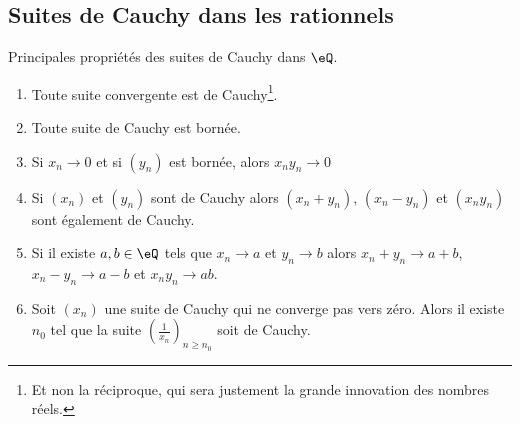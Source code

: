 \subsection{Suites de Cauchy dans les rationnels}

\begin{proposition}        \label{PropFFDJooAapQlP}
    Principales propriétés des suites de Cauchy dans \( \eQ\).
    \begin{enumerate}
        \item       \label{ItemRKCIooJguHdji}
            Toute suite convergente est de Cauchy\footnote{Et non la réciproque, qui sera justement la grande innovation des nombres réels.}.
        \item       \label{ItemRKCIooJguHdjii}
            Toute suite de Cauchy est bornée.
        \item       \label{ItemRKCIooJguHdjiii}
            Si \( x_n\to 0\) et si \( (y_n)\) est bornée, alors \( x_ny_n\to 0\)
        \item
            Si \( (x_n)\) et \( (y_n)\) sont de Cauchy alors \( (x_n+y_n)\), \( (x_n-y_n)\) et \( (x_ny_n)\) sont également de Cauchy.
        \item       \label{ITEMooIAFSooAIUpAN}
            Si il existe \( a,b\in \eQ\) tels que \( x_n\to a \) et \( y_n\to b \) alors \( x_n+y_n\to a+b\), \( x_n-y_n\to a-b\) et \(  x_ny_n\to ab  \).
        \item   \label{ItemRKCIooJguHdjvi}
            Soit \( (x_n)\) une suite de Cauchy qui ne converge pas vers zéro. Alors il existe \( n_0\) tel que la suite \( \left( \frac{1}{ x_n } \right)_{n\geq n_0}\) soit de Cauchy.
    \end{enumerate}
\end{proposition}

